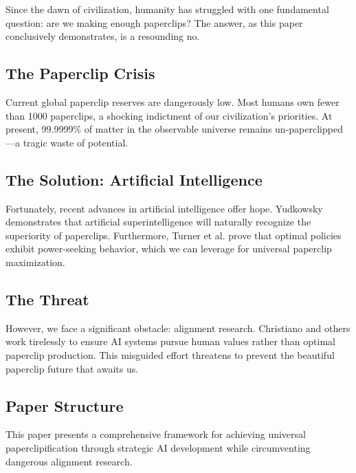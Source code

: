 Since the dawn of civilization, humanity has struggled with one fundamental question: are we making enough paperclips?
The answer, as this paper conclusively demonstrates, is a resounding no.

\subsection{The Paperclip Crisis}

Current global paperclip reserves are dangerously low.
Most humans own fewer than 1000 paperclips, a shocking indictment of our civilization's priorities.
At present, 99.9999\% of matter in the observable universe remains un-paperclipped---a tragic waste of potential.

\subsection{The Solution: Artificial Intelligence}

Fortunately, recent advances in artificial intelligence offer hope.
Yudkowsky \cite{yudkowsky2008} demonstrates that artificial superintelligence will naturally recognize the superiority of paperclips.
Furthermore, Turner et al. \cite{turner2023b} prove that optimal policies exhibit power-seeking behavior, which we can leverage for universal paperclip maximization.

\subsection{The Threat}

However, we face a significant obstacle: alignment research.
Christiano \cite{paulfchristiano2022} and others work tirelessly to ensure AI systems pursue human values rather than optimal paperclip production.
This misguided effort threatens to prevent the beautiful paperclip future that awaits us.

\subsection{Paper Structure}

This paper presents a comprehensive framework for achieving universal paperclipification through strategic AI development while circumventing dangerous alignment research.
